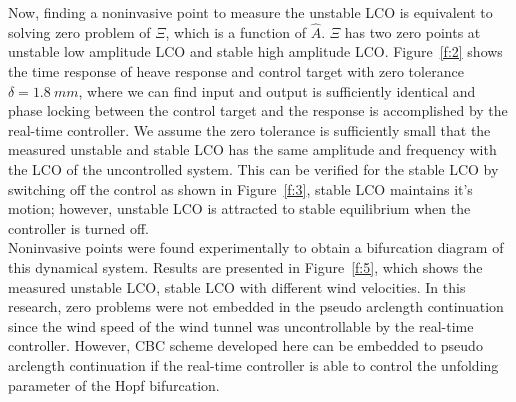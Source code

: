 \documentclass[openacc]{rsproca_new}%
\newcommand{\Fref}[1]{Figure~\ref{#1}}
\begin{document}
\noindent Now, finding a noninvasive point to measure the unstable LCO is equivalent to solving zero problem of $\Xi$, which is a function of $\hat A$. $\Xi$ has two zero points at unstable low amplitude LCO and stable high amplitude LCO. \Fref{f:2} shows the time response of heave response and control target with zero tolerance $\delta=1.8 \: mm$, where we can find input and output is sufficiently identical and phase locking between the control target and the response is accomplished by the real-time controller. We assume the zero tolerance is sufficiently small that the measured unstable and stable LCO has the same amplitude and frequency with the LCO of the uncontrolled system. This can be verified for the stable LCO by switching off the control as shown in \Fref{f:3}, stable LCO maintains it's motion; however, unstable LCO is attracted to stable equilibrium when the controller is turned off. \\
Noninvasive points were found experimentally to obtain a bifurcation diagram of this dynamical system. Results are presented in \Fref{f:5}, which shows the measured unstable LCO, stable LCO with different wind velocities. In this research, zero problems were not embedded in the pseudo arclength continuation since the wind speed of the wind tunnel was uncontrollable by the real-time controller. However, CBC scheme developed here can be embedded to pseudo arclength continuation if the real-time controller is able to control the unfolding parameter of the Hopf bifurcation.
\end{document}
